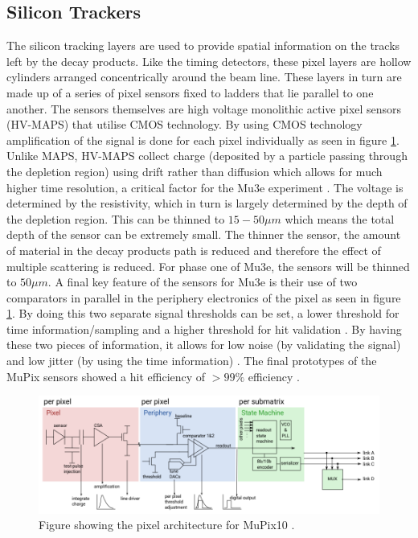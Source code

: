\subsection*{Silicon Trackers}
The silicon tracking layers are used to provide spatial information on the tracks left by the decay products. 
Like the timing detectors, these pixel layers are hollow cylinders arranged concentrically around the beam line. 
These layers in turn are made up of a series of pixel sensors fixed to ladders that lie parallel to one another. 
The sensors themselves are high voltage monolithic active pixel sensors (HV-MAPS) that utilise CMOS technology. 
By using CMOS technology amplification of the signal is done for each pixel individually as seen in figure \ref{fig:pix}. 
Unlike MAPS, HV-MAPS collect charge (deposited by a particle passing through the depletion region) using drift rather than diffusion which allows for much higher time resolution, a critical factor for the Mu3e experiment \cite{schoning2020mupix}. 
The voltage is determined by the resistivity, which in turn is largely determined by the depth of the depletion region. 
This can be thinned to $15-50 \mu m$ which means the total depth of the sensor can be extremely small. 
The thinner the sensor, the amount of material in the decay products path is reduced and therefore the effect of multiple scattering is reduced. 
For phase one of Mu3e, the sensors will be thinned to $50 \mu m$. A final key feature of the sensors for Mu3e is their use of two comparators in parallel in the periphery electronics of the pixel as seen in figure \ref{fig:pix}. 
By doing this two separate signal thresholds can be set, a lower threshold for time information/sampling and a higher threshold for hit validation \cite{augustin2021mupix10}. 
By having these two pieces of information, it allows for low noise (by validating the signal) and low jitter (by using the time information) \cite{schoning2020mupix}. 
The final prototypes of the MuPix sensors showed a hit efficiency of $>99\%$ efficiency \cite{rudzki2021mu3e}.

\begin{figure}
    \centering
    \includegraphics[width=\textwidth]{fig/setup/pix.PNG}
    \caption{Figure showing the pixel architecture for MuPix10 \cite{augustin2021mupix10}.}
    \label{fig:pix}
\end{figure}

